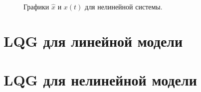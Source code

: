 \begin{figure}[!h]
	\caption{Графики $\hat{x}$ и $x(t)$ для нелинейной системы.}
	\label{6_kalm_x_1}
\end{figure}

\section{LQG для линейной модели}


\section{LQG для нелинейной модели}


\endinput